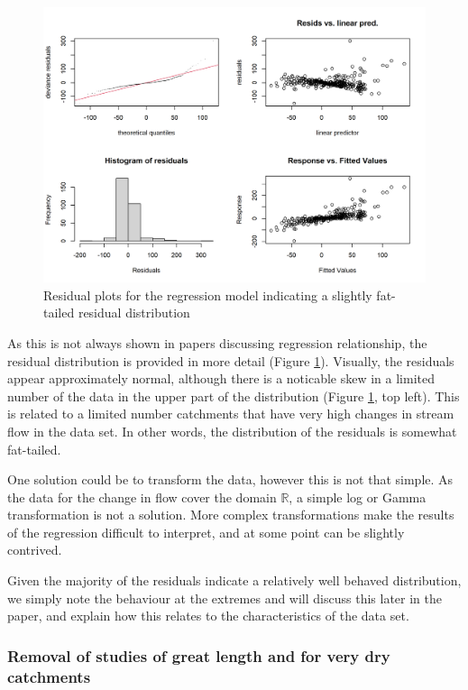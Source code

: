 \documentclass[]{elsarticle} %
\begin{document}
\begin{figure}
\includegraphics[width=0.9\linewidth]{residual_plot_model_all} \caption{Residual plots for the regression model indicating a slightly fat-tailed residual distribution}\label{fig:gamcheckmodelall}
\end{figure}

As this is not always shown in papers discussing regression relationship, the residual distribution is provided in more detail (Figure \ref{fig:gamcheckmodelall}). Visually, the residuals appear approximately normal, although there is a noticable skew in a limited number of the data in the upper part of the distribution (Figure \ref{fig:gamcheckmodelall}, top left). This is related to a limited number catchments that have very high changes in stream flow in the data set. In other words, the distribution of the residuals is somewhat fat-tailed.

One solution could be to transform the data, however this is not that simple. As the data for the change in flow cover the domain \(\mathbb{R}\), a simple log or Gamma transformation is not a solution. More complex transformations make the results of the regression difficult to interpret, and at some point can be slightly contrived.

Given the majority of the residuals indicate a relatively well behaved distribution, we simply note the behaviour at the extremes and will discuss this later in the paper, and explain how this relates to the characteristics of the data set.

\hypertarget{removal-of-studies-of-great-length-and-for-very-dry-catchments}{%
\subsubsection{Removal of studies of great length and for very dry catchments}\label{removal-of-studies-of-great-length-and-for-very-dry-catchments}}
\end{document}
